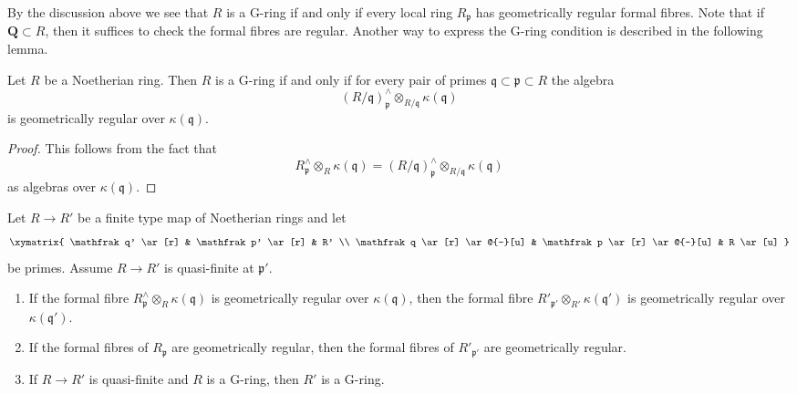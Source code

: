 \noindent
By the discussion above we see that $R$ is a G-ring if and only if
every local ring $R_\mathfrak p$ has geometrically regular formal fibres.
Note that if $\mathbf{Q} \subset R$, then it suffices to check the
formal fibres are regular.
Another way to express the G-ring condition is described in the
following lemma.

\begin{lemma}
\label{lemma-check-G-ring-easy}
Let $R$ be a Noetherian ring. Then $R$ is a G-ring if and only if
for every pair of primes $\mathfrak q \subset \mathfrak p \subset R$
the algebra
$$
(R/\mathfrak q)_\mathfrak p^\wedge \otimes_{R/\mathfrak q} \kappa(\mathfrak q)
$$
is geometrically regular over $\kappa(\mathfrak q)$.
\end{lemma}

\begin{proof}
This follows from the fact that
$$
R_\mathfrak p^\wedge \otimes_R \kappa(\mathfrak q) =
(R/\mathfrak q)_\mathfrak p^\wedge \otimes_{R/\mathfrak q} \kappa(\mathfrak q)
$$
as algebras over $\kappa(\mathfrak q)$.
\end{proof}

\begin{lemma}
\label{lemma-G-ring-goes-up-quasi-finite}
Let $R \to R'$ be a finite type map of Noetherian rings and let
$$
\xymatrix{
\mathfrak q' \ar[r] & \mathfrak p' \ar[r] & R' \\
\mathfrak q \ar[r] \ar@{-}[u] &
\mathfrak p \ar[r] \ar@{-}[u] & R \ar[u]
}
$$
be primes. Assume $R \to R'$ is quasi-finite at $\mathfrak p'$.
\begin{enumerate}
\item If the formal fibre $R_\mathfrak p^\wedge \otimes_R \kappa(\mathfrak q)$
is geometrically regular over $\kappa(\mathfrak q)$, then the formal fibre
$R'_{\mathfrak p'} \otimes_{R'} \kappa(\mathfrak q')$ is geometrically regular
over $\kappa(\mathfrak q')$.
\item If the formal fibres of $R_\mathfrak p$ are geometrically regular,
then the formal fibres of $R'_{\mathfrak p'}$ are geometrically regular.
\item If $R \to R'$ is quasi-finite and $R$ is a G-ring, then $R'$ is
a G-ring.
\end{enumerate}
\end{lemma}

